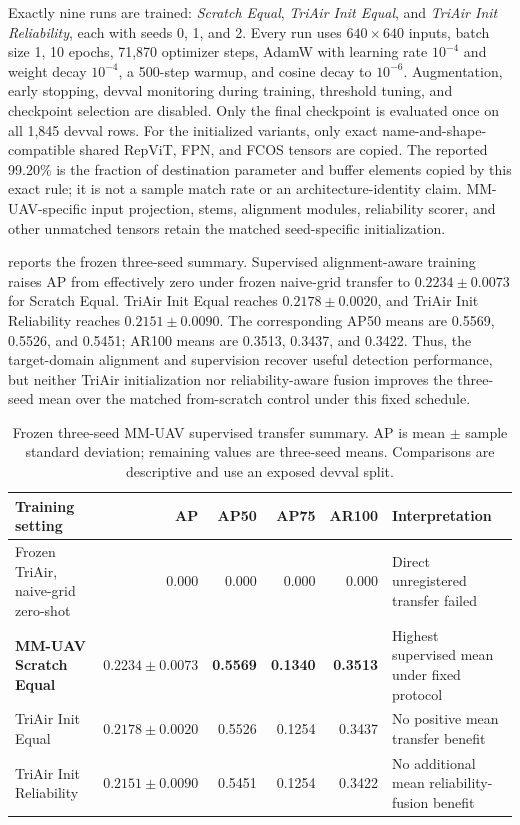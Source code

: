Exactly nine runs are trained: \textit{Scratch Equal}, \textit{TriAir Init Equal}, and \textit{TriAir Init Reliability}, each with seeds 0, 1, and 2. Every run uses $640\times640$ inputs, batch size 1, 10 epochs, 71,870 optimizer steps, AdamW with learning rate $10^{-4}$ and weight decay $10^{-4}$, a 500-step warmup, and cosine decay to $10^{-6}$. Augmentation, early stopping, devval monitoring during training, threshold tuning, and checkpoint selection are disabled. Only the final checkpoint is evaluated once on all 1,845 devval rows. For the initialized variants, only exact name-and-shape-compatible shared RepViT, FPN, and FCOS tensors are copied. The reported 99.20\% is the fraction of destination parameter and buffer elements copied by this exact rule; it is not a sample match rate or an architecture-identity claim. MM-UAV-specific input projection, stems, alignment modules, reliability scorer, and other unmatched tensors retain the matched seed-specific initialization.

 reports the frozen three-seed summary. Supervised alignment-aware training raises AP from effectively zero under frozen naive-grid transfer to $0.2234\pm0.0073$ for Scratch Equal. TriAir Init Equal reaches $0.2178\pm0.0020$, and TriAir Init Reliability reaches $0.2151\pm0.0090$. The corresponding AP50 means are 0.5569, 0.5526, and 0.5451; AR100 means are 0.3513, 0.3437, and 0.3422. Thus, the target-domain alignment and supervision recover useful detection performance, but neither TriAir initialization nor reliability-aware fusion improves the three-seed mean over the matched from-scratch control under this fixed schedule.

\begin{table}[t]
\centering
\caption{Frozen three-seed MM-UAV supervised transfer summary. AP is mean $\pm$ sample standard deviation; remaining values are three-seed means. Comparisons are descriptive and use an exposed devval split.}
\label{tab:mmuav-transfer}
\scriptsize
\begin{tabularx}{\textwidth}{@{}YrrrrY@{}}
\toprule
Training setting & AP & AP50 & AP75 & AR100 & Interpretation\\
\midrule
Frozen TriAir, naive-grid zero-shot & 0.000 & 0.000 & 0.000 & 0.000 & Direct unregistered transfer failed\\
\textbf{MM-UAV Scratch Equal} & $\mathbf{0.2234\pm0.0073}$ & \textbf{0.5569} & \textbf{0.1340} & \textbf{0.3513} & Highest supervised mean under fixed protocol\\
TriAir Init Equal & $0.2178\pm0.0020$ & 0.5526 & 0.1254 & 0.3437 & No positive mean transfer benefit\\
TriAir Init Reliability & $0.2151\pm0.0090$ & 0.5451 & 0.1254 & 0.3422 & No additional mean reliability-fusion benefit\\
\bottomrule
\end{tabularx}
\end{table}

